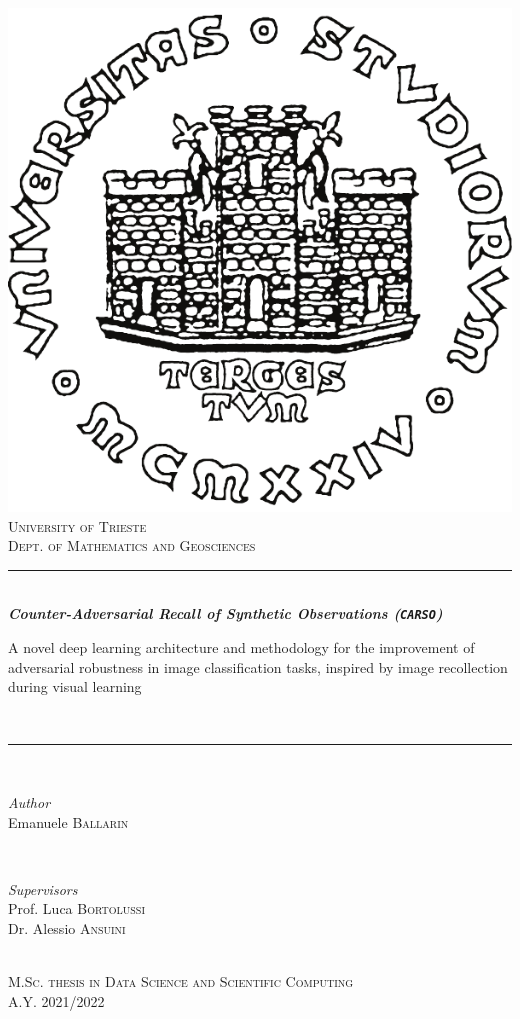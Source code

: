\begin{titlepage}

    \center

    \vspace*{0.8cm}

    \includegraphics[width=0.30\linewidth]{img/logounits.pdf}
    \\[0.9cm]
    \textsc{\LARGE{University of Trieste}}
    \\
    \Large \textsc{Dept. of Mathematics and Geosciences}
    \\[1.2cm]

    \rule{\linewidth}{0.5mm}
    \\[0.4cm]
    { \huge \bfseries \textit{Counter-Adversarial Recall of Synthetic Observations (\texttt{\textit{CARSO}})}}
    \\[0.4cm]
    \begin{minipage}{0.95\textwidth}
        { \LARGE A novel deep learning architecture and methodology for the improvement of adversarial robustness in image classification tasks, inspired by image recollection during visual learning}
    \end{minipage}
    \\[0.4cm]
    \rule{\linewidth}{0.5mm}
    \\[1.8cm]

    \begin{minipage}{0.4\textwidth}
        \begin{flushleft}
            \Large \emph{{Author}}
            \\
            {Emanuele} \textsc{{Ballarin}}
        \end{flushleft}
    \end{minipage}
    ~
    \begin{minipage}{0.4\textwidth}
        \begin{flushleft}
            \Large \emph{{Supervisors}}
            \\
            {Prof. Luca} \textsc{{Bortolussi}}
            \\
            {Dr. Alessio} \textsc{{Ansuini}}
        \end{flushleft}
    \end{minipage}
    \\[2cm]

    \Large \textsc{M.Sc. thesis in Data Science and Scientific Computing
        \\
        A.Y. 2021/2022}
    \vfill

\end{titlepage}
